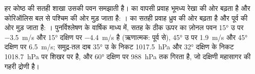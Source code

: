 हर कोष्ठ की सतही शाखा उसकी पवन समझाती है।  का वापसी प्रवाह भूमध्य रेखा की ओर बढ़ता है और कोरिऑलिस बल से पश्चिम की ओर मुड़ जाता है: ।  का सतही प्रवाह ध्रुव की ओर बढ़ता है और पूर्व की ओर मुड़ जाता है: । पुनर्विश्लेषण के वार्षिक माध्य में, सतह के ठीक ऊपर का ज़ोनल पवन \ang{15} उ पर \qty{-3.5}{m/s} और \ang{15} दक्षिण पर \qty{-4.4}{m/s} है (ऋणात्मक: पूर्व से), \ang{45} उ पर \qty{+1.9}{m/s} और \ang{45} दक्षिण पर \qty{+6.5}{m/s}; समुद्र-तल दाब \ang{35} उ के निकट \qty{1017.5}{hPa} और \ang{32} दक्षिण के निकट \qty{1018.7}{hPa} पर शिखर पर है, और \ang{60} दक्षिण पर \qty{988}{hPa} तक गिरता है, जो दक्षिणी महासागर की गहरी द्रोणी है।

